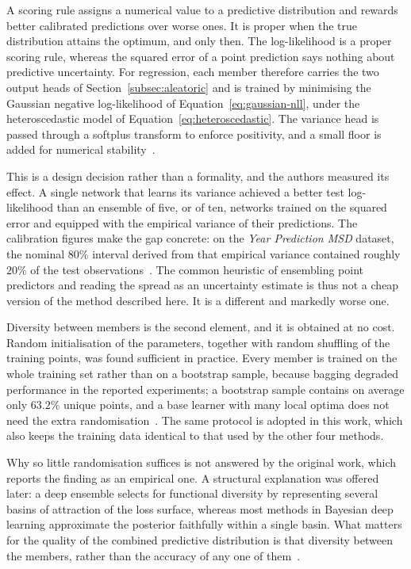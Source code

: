 A scoring rule assigns a numerical value to a predictive distribution and
rewards better calibrated predictions over worse ones. It is proper when the
true distribution attains the optimum, and only then. The log-likelihood is a
proper scoring rule, whereas the squared error of a point prediction says
nothing about predictive uncertainty. For regression, each member therefore
carries the two output heads of Section~\ref{subsec:aleatoric} and is trained by
minimising the Gaussian negative log-likelihood of
Equation~\eqref{eq:gaussian-nll}, under the heteroscedastic model of
Equation~\eqref{eq:heteroscedastic}. The variance head is passed through a
softplus transform to enforce positivity, and a small floor is added for
numerical stability~\cite{lakshminarayanan2017}.

This is a design decision rather than a formality, and the authors measured its
effect. A single network that learns its variance achieved a better test
log-likelihood than an ensemble of five, or of ten, networks trained on the
squared error and equipped with the empirical variance of their predictions. The
calibration figures make the gap concrete: on the \emph{Year Prediction MSD}
dataset, the nominal $80\%$ interval derived from that empirical variance
contained roughly $20\%$ of the test observations~\cite{lakshminarayanan2017}.
The common heuristic of ensembling point predictors and reading the spread as an
uncertainty estimate is thus not a cheap version of the method described here.
It is a different and markedly worse one.

Diversity between members is the second element, and it is obtained at no cost.
Random initialisation of the parameters, together with random shuffling of the
training points, was found sufficient in practice. Every member is trained on
the whole training set rather than on a bootstrap sample, because bagging
degraded performance in the reported experiments; a bootstrap sample contains on
average only $63.2\%$ unique points, and a base learner with many local optima
does not need the extra randomisation~\cite{lakshminarayanan2017}. The same
protocol is adopted in this work, which also keeps the training data identical
to that used by the other four methods.

Why so little randomisation suffices is not answered by the original work, which
reports the finding as an empirical one. A structural explanation was offered
later: a deep ensemble selects for functional diversity by representing several
basins of attraction of the loss surface, whereas most methods in Bayesian deep
learning approximate the posterior faithfully within a single basin. What
matters for the quality of the combined predictive distribution is that
diversity between the members, rather than the accuracy of any one of
them~\cite{wilson2020}.

